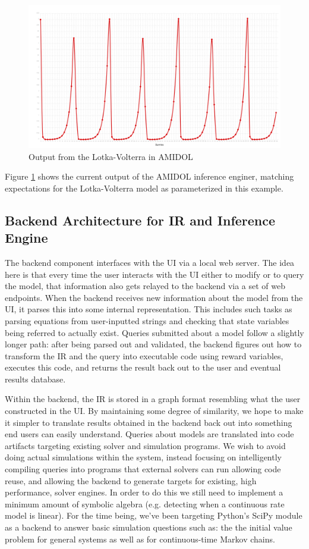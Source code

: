 \documentclass[11pt]{article}
\newcommand{\amidol}{\textsc{AMIDOL}}
\begin{document}
\begin{figure}
  \includegraphics[width=\textwidth]{figs/bunnies.png}
\caption{Output from the Lotka-Volterra in \amidol{}}
\label{Fig:LKOut}
\end{figure}

Figure \ref{Fig:LKOut} shows the current output of the \amidol{} inference enginer, matching expectations for the Lotka-Volterra model as parameterized in this example.

\subsection{Backend Architecture for IR and Inference Engine}

The backend component interfaces with the UI via a local web server. The idea here is that every time the user interacts with the UI either to modify or to query the model, that information also gets relayed to the backend via a set of web endpoints. When the backend receives new information about the model from the UI, it parses this into some internal representation. This includes such tasks as parsing equations from user-inputted strings and checking that state variables being referred to actually exist. Queries submitted about a model follow a slightly longer path: after being parsed out and validated, the backend figures out how to transform the IR and the query into executable code using reward variables, executes this code, and returns the result back out to the user and eventual results database.

Within the backend, the IR is stored in a graph format resembling what the user constructed in the UI. By maintaining some degree of similarity, we hope to make it simpler to translate results obtained in the backend back out into something end users can easily understand. Queries about models are translated into code artifacts targeting existing solver and simulation programs. We wish to avoid doing actual simulations within the system, instead focusing on intelligently compiling queries into programs that external solvers can run allowing code reuse, and allowing the backend to generate targets for existing, high performance, solver engines. In order to do this we still need to implement a minimum amount of symbolic algebra (e.g. detecting when a continuous rate  model is linear). For the time being, we’ve been targeting Python’s SciPy module as a backend to answer basic simulation questions such as: the the initial value problem for general systems as well as for continuous-time Markov chains.
\end{document}
